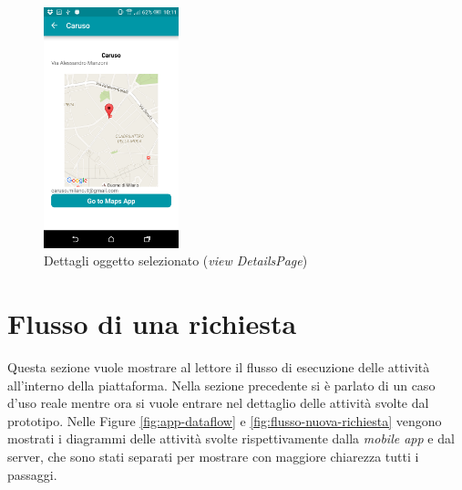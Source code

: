 \begin{figure}[ht]
	\centering
	\includegraphics[width=0.35\textwidth]{4-progettazione-alto-livello/Immagini/details_caso_d'uso.png}
	\caption{Dettagli oggetto selezionato (\emph{view DetailsPage})}\label{fig:usecase-details}
\end{figure} 



\section{Flusso di una richiesta\label{sec:flusso-richiesta}}

Questa sezione vuole mostrare al lettore il flusso di esecuzione delle attività all'interno della piattaforma. Nella sezione precedente si è parlato di un caso d'uso reale mentre ora si vuole entrare nel dettaglio delle attività svolte dal prototipo. Nelle Figure \ref{fig:app-dataflow} e \ref{fig:flusso-nuova-richiesta} vengono mostrati i diagrammi delle attività svolte rispettivamente dalla \emph{mobile app} e dal server, che sono stati separati per mostrare con maggiore chiarezza tutti i passaggi.

